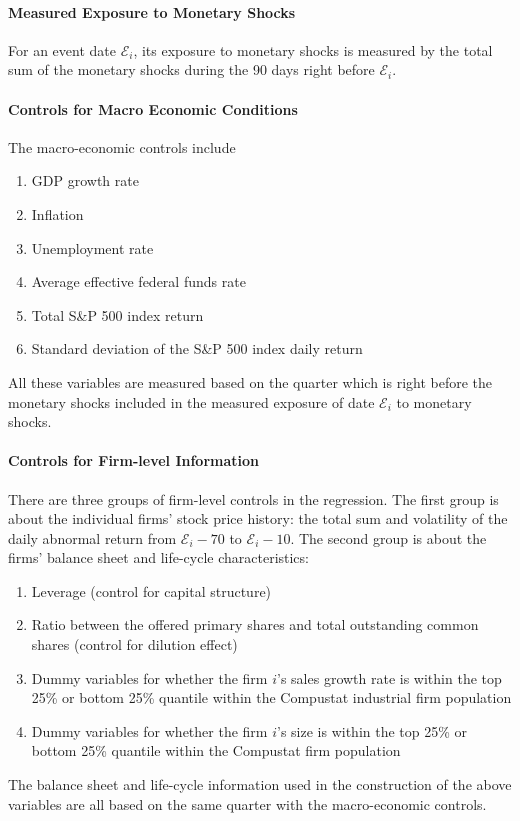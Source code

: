 \documentclass[11pt]{article}
\begin{document}
\paragraph{Measured Exposure to Monetary Shocks}
For an event date $ \mathcal{E}_{i} $, its exposure to monetary shocks is measured by the total sum of the monetary shocks during the 90 days right before $ \mathcal{E}_{i} $. 
\paragraph{Controls for Macro Economic Conditions} The macro-economic controls include
\begin{enumerate}
	\item GDP growth rate
	\item Inflation
	\item Unemployment rate
	\item Average effective federal funds rate
	\item Total S\&P 500 index return
	\item Standard deviation of the S\&P 500 index daily return
\end{enumerate}

All these variables are measured based on the quarter which is right before the monetary shocks included in the measured exposure of date $ \mathcal{E}_{i} $ to monetary shocks.

\paragraph{Controls for Firm-level Information} There are three groups of firm-level controls in the regression. The first group is about the individual firms' stock price history: the total sum and volatility of the daily abnormal return from $ \mathcal{E}_{i}-70 $ to $ \mathcal{E}_{i}-10 $. The second group is about the firms' balance sheet and life-cycle characteristics:
\begin{enumerate}
	\item Leverage (control for capital structure)
	\item Ratio between the offered primary shares and total outstanding common shares (control for dilution effect)
	\item Dummy variables for whether the firm $ i $'s sales growth rate is within the top 25\% or bottom 25\% quantile within the Compustat industrial firm population 
	\item Dummy variables for whether the firm $ i $'s size is within the top 25\% or bottom 25\% quantile within the Compustat firm population
\end{enumerate}
The balance sheet and life-cycle information used in the construction of the above variables are all based on the same quarter with the macro-economic controls. 
\end{document}
